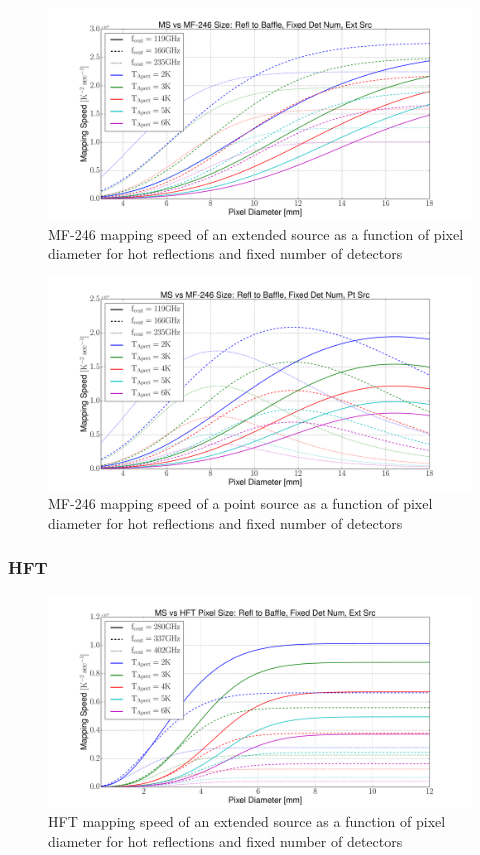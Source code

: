 \documentclass[12pt, titlepage]{article} %
\begin{document}
\begin{figure}[H]
	\centering
	\includegraphics[width=1.1\textwidth, center]{PDF/LFT_MS_MF-246_hotRefl_fixDetNum_extSrc.pdf}
	\caption{MF-246 mapping speed of an extended source as a function of pixel diameter for hot reflections and fixed number of detectors}
\end{figure}

\begin{figure}[H]
	\centering
	\includegraphics[width=1.1\textwidth, center]{PDF/LFT_MS_MF-246_hotRefl_fixDetNum_ptSrc.pdf}
	\caption{MF-246 mapping speed of a point source as a function of pixel diameter for hot reflections and fixed number of detectors}
\end{figure}


\subsubsection{HFT}

\begin{figure}[H]
	\centering
	\includegraphics[width=1.1\textwidth, center]{PDF/HFT_MS_hotRefl_fixDetNum_extSrc.pdf}
	\caption{HFT mapping speed of an extended source as a function of pixel diameter for hot reflections and fixed number of detectors}
\end{figure}
\end{document}
